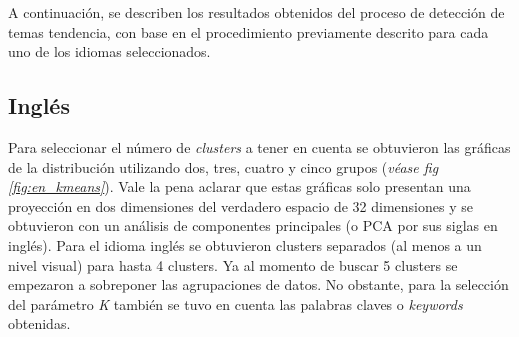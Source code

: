 A continuación, se describen los resultados obtenidos del proceso de detección de temas tendencia, con base en el procedimiento previamente descrito para cada uno de los idiomas seleccionados.

\subsection{Inglés}

Para seleccionar el número de \textit{clusters} a tener en cuenta se obtuvieron las gráficas de la distribución utilizando dos, tres, cuatro y cinco grupos (\textit{véase fig \ref{fig:en_kmeans}}). Vale la pena aclarar que estas gráficas solo presentan una proyección en dos dimensiones del verdadero espacio de 32 dimensiones y se obtuvieron con un análisis de componentes principales (o PCA por sus siglas en inglés). Para el idioma inglés se obtuvieron clusters separados (al menos a un nivel visual) para hasta 4 clusters. Ya al momento de buscar 5 clusters se empezaron a sobreponer las agrupaciones de datos. No obstante, para la selección del parámetro \textit{K} también se tuvo en cuenta las palabras claves o \textit{keywords} obtenidas. \\

